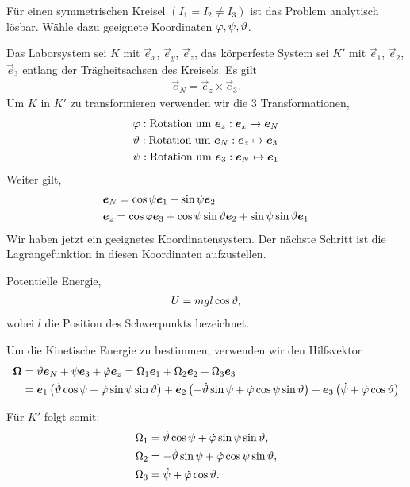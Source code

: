 Für einen symmetrischen Kreisel $(I_1=I_2\neq I_3)$ ist das Problem analytisch
lösbar. Wähle dazu geeignete Koordinaten $\varphi,\psi,\vartheta$.

Das Laborsystem sei $K$ mit $\vec{e}_x$, $\vec{e}_y$, $\vec{e}_z$, das
körperfeste System sei $K'$ mit $\vec{e}_1$, $\vec{e}_2$, $\vec{e}_3$ entlang
der Trägheitsachsen des Kreisels. Es gilt
\begin{align*}
\vec{e}_N = \vec{e}_z\times \vec{e}_3.
\end{align*}
Um $K$ in $K'$ zu transformieren verwenden wir die 3 Transformationen,
\begin{align*}
&\varphi: \text{Rotation um } \bm{e}_z: \bm{e}_x\mapsto \bm{e}_N\\
&\vartheta: \text{Rotation um } \bm{e}_N: \bm{e}_z\mapsto \bm{e}_3\\
&\psi: \text{Rotation um } \bm{e}_3: \bm{e}_N\mapsto \bm{e}_1
\end{align*}
Weiter gilt,
\begin{align*}
&\bm{e}_N = \cos\psi \bm{e}_1 - \sin\psi \bm{e}_2\\
&\bm{e}_z = \cos\varphi \bm{e}_3 + \cos\psi \sin\vartheta \bm{e}_2 + \sin\psi \sin\vartheta
\bm{e}_1
\end{align*}
Wir haben jetzt ein geeignetes Koordinatensystem. Der nächste Schritt ist die
Lagrangefunktion in diesen Koordinaten aufzustellen.

Potentielle Energie,
\begin{align*}
U = m g l \cos\vartheta,
\end{align*}
wobei $l$ die Position des Schwerpunkts bezeichnet.

Um die Kinetische Energie zu bestimmen, verwenden wir den Hilfsvektor
\begin{align*}
\bm{\Omega} &= \dot{\vartheta}\bm{e}_N + \dot{\psi}\bm{e}_3 + \dot{\varphi}\bm{e}_z =
\Omega_1 \bm{e}_1 + \Omega_2\bm{e}_2 + \Omega_3\bm{e}_3\\
&= \bm{e}_1\left(\dot{\vartheta}\cos\psi + \dot{\varphi}\sin\psi\sin\vartheta \right)
+ \bm{e}_2 \left( -\dot{\vartheta}\sin\psi + \dot{\varphi}\cos\psi\sin\vartheta \right)
+ \bm{e}_3 \left(\dot{\psi} + \dot{\varphi}\cos\vartheta\right)
\end{align*}

Für $K'$ folgt somit:
\begin{align*}
&\Omega_1 = \dot{\vartheta}\cos\psi + \dot{\varphi}\sin\psi\sin\vartheta,\\
&\Omega_2 = -\dot{\vartheta}\sin\psi + \dot{\varphi}\cos\psi\sin\vartheta,\\
&\Omega_3 = \dot{\psi} + \dot{\varphi}\cos\vartheta.
\end{align*}

